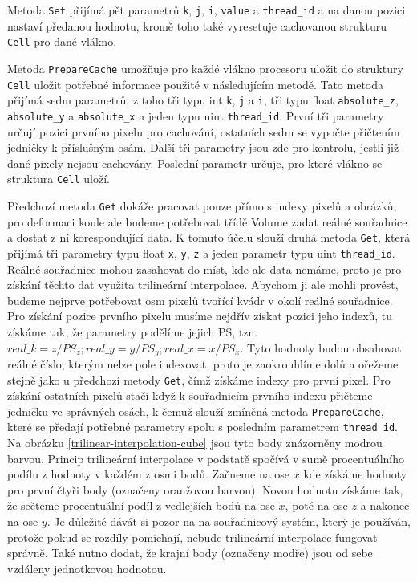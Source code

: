 Metoda \verb|Set| přijímá pět parametrů \verb|k|, \verb|j|, \verb|i|, \verb|value| a \verb|thread_id| a na danou pozici nastaví předanou hodnotu, kromě toho také vyresetuje cachovanou strukturu \verb|Cell| pro dané vlákno.

Metoda \verb|PrepareCache| umožňuje pro každé vlákno procesoru uložit do struktury \verb|Cell| uložit potřebné informace použité v následujícím metodě. Tato metoda přijímá sedm parametrů, z toho tři typu int \verb|k|, \verb|j| a \verb|i|, tři typu float \verb|absolute_z|, \verb|absolute_y| a \verb|absolute_x| a jeden typu uint \verb|thread_id|. První tři parametry určují pozici prvního pixelu pro cachování, ostatních sedm se vypočte přičtením jedničky k příslušným osám. Další tři parametry jsou zde pro kontrolu, jestli již dané pixely nejsou cachovány. Poslední parametr určuje, pro které vlákno se struktura \verb|Cell| uloží.

Předchozí metoda \verb|Get| dokáže pracovat pouze přímo s indexy pixelů a obrázků, pro deformaci koule ale budeme potřebovat třídě Volume zadat reálné souřadnice a dostat z ní korespondující data. K tomuto účelu slouží druhá metoda \verb|Get|, která přijímá tři parametry typu float \verb|x|, \verb|y|, \verb|z| a jeden parametr typu uint \verb|thread_id|. Reálné souřadnice mohou zasahovat do míst, kde ale data nemáme, proto je pro získání těchto dat využita trilineární interpolace. Abychom ji ale mohli provést, budeme nejprve potřebovat osm pixelů tvořící kvádr v okolí reálné souřadnice. Pro získání pozice prvního pixelu musíme nejdřív získat pozici jeho indexů, tu získáme tak, že parametry podělíme jejich PS, tzn. $real\_k = z / PS_z; real\_y = y / PS_y; real\_x = x / PS_x$. Tyto hodnoty budou obsahovat reálné číslo, kterým nelze pole indexovat, proto je zaokrouhlíme dolů a ořežeme stejně jako u předchozí metody \verb|Get|, čímž získáme indexy pro první pixel. Pro získání ostatních pixelů stačí když k souřadnicím prvního indexu přičteme jedničku ve správných osách, k čemuž slouží zmíněná metoda \verb|PrepareCache|, které se předají potřebné parametry spolu s posledním parametrem \verb|thread_id|. Na obrázku \ref{trilinear-interpolation-cube} jsou tyto body znázorněny modrou barvou. Princip trilineární interpolace v podstatě spočívá v sumě procentuálního podílu z hodnoty v každém z osmi bodů. Začneme na ose $x$ kde získáme hodnoty pro první čtyři body (označeny oranžovou barvou). Novou hodnotu získáme tak, že sečteme procentuální podíl z vedlejších bodů na ose $x$, poté na ose $z$ a nakonec na ose $y$. Je důležité dávát si pozor na na souřadnicový systém, který je používán, protože pokud se rozdíly pomíchají, nebude trilineární interpolace fungovat správně. Také nutno dodat, že krajní body (označeny modře) jsou od sebe vzdáleny jednotkovou hodnotou.

